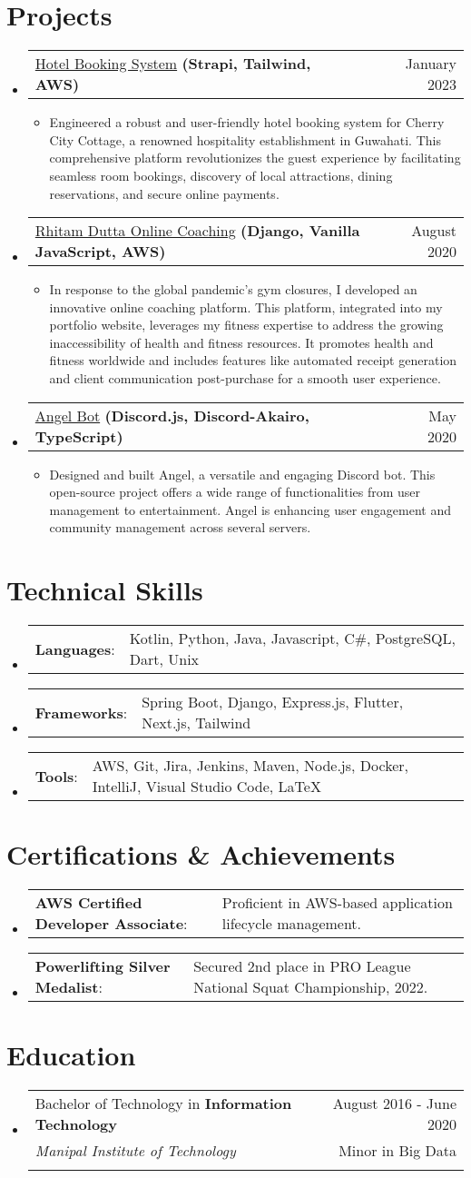 \documentclass[letterpaper,11pt]{article}
\makeatletter
\newcommand{\sectionStart}{
  \begin{itemize}[label={},leftmargin=0in]
}
\newcommand{\sectionEnd}{
  \end{itemize}
}
\newcommand{\educationItem}[5]{
  \vspace{-1pt}
  \item
  \begin{tabular*}{\textwidth}{l@{\extracolsep{\fill}}r@{}}
    \footnotesize{#1 in \textbf{#2}}  & \footnotesize{#3}\\
    \footnotesize{\textit{#4}} & \footnotesize{#5}\\\vspace{-5pt}
  \end{tabular*}
  \vspace{-5pt}
}
\newcommand{\skillItem}[2]{
  \vspace{-1pt}
  \item
  \begin{tabular*}{1.0\textwidth}{l@{}l@{}}
    \footnotesize{\textbf{#1}: } & \footnotesize{#2}
  \end{tabular*}\vspace{-22pt}
}
\newcommand{\projectHeading}[4]{
  \vspace{-1pt}
  \item
  \begin{tabular*}{1.0\textwidth}{l@{\extracolsep{\fill}}r@{}}
    \small{{\href{#1}{#2}} \textbf{#3}} & \small{#4} \\
  \end{tabular*}\vspace{-5pt}
}
\newcommand{\listStart}{\begin{itemize}}
\newcommand{\listEnd}{\end{itemize}\vspace{-6pt}}
\newcommand{\bulletItem}[1]{
  \item
  \small{
    {#1 \vspace{-1.8pt}}
  }
}
\newcommand{\certItem}[2]{
  \vspace{-1pt}
  \item
  \begin{tabular*}{1.0\textwidth}{l@{}l@{}}
    \footnotesize{\textbf{#1}: } & \footnotesize{#2}
  \end{tabular*}\vspace{-22pt}
}
\makeatother
\begin{document}
\section{Projects}
\sectionStart
\projectHeading
    {https://github.com/exthazor/CherryCityCottage-Frontend/}
    {Hotel Booking System}
    {(Strapi, Tailwind, AWS)}
    {January 2023}
  \listStart
    \bulletItem
      {Engineered a robust and user-friendly hotel booking system for Cherry City Cottage, a renowned hospitality establishment in Guwahati. This comprehensive platform revolutionizes the guest experience by facilitating seamless room bookings, discovery of local attractions, dining reservations, and secure online payments.}
  \listEnd
  \projectHeading
    {https://github.com/exthazor/rhitamdutta/}
    {Rhitam Dutta Online Coaching}
    {(Django, Vanilla JavaScript, AWS)}
    {August 2020}
  \listStart
    \bulletItem
      {In response to the global pandemic's gym closures, I developed an innovative online coaching platform. This platform, integrated into my portfolio website, leverages my fitness expertise to address the growing inaccessibility of health and fitness resources. It promotes health and fitness worldwide and includes features like automated receipt generation and client communication post-purchase for a smooth user experience.}
  \listEnd
  \projectHeading
    {https://github.com/exthazor/angel}
    {Angel Bot}
    {(Discord.js, Discord-Akairo, TypeScript)}
    {May 2020}
  \listStart
    \bulletItem
    {Designed and built Angel, a versatile and engaging Discord bot. This open-source project offers a wide range of functionalities from user management to entertainment. Angel is enhancing user engagement and community management across several servers.}
  \listEnd
\sectionEnd

\section{Technical Skills}
\sectionStart
  \skillItem
    {Languages}
    {Kotlin, Python, Java, Javascript, C\#, PostgreSQL, Dart, Unix}
  \skillItem
    {Frameworks}
    {Spring Boot, Django, Express.js, Flutter, Next.js, Tailwind}
  \skillItem
    {Tools}
    {AWS, Git, Jira, Jenkins, Maven, Node.js, Docker, IntelliJ, Visual Studio Code, \LaTeX\ }
  \vspace{3pt}
\sectionEnd

\section{Certifications \& Achievements}
\sectionStart
    \certItem 
     {AWS Certified Developer Associate} {Proficient in AWS-based application lifecycle management.}
    \certItem 
     {Powerlifting Silver Medalist} {Secured 2nd place in PRO League National Squat Championship, 2022.}
\sectionEnd


\section{Education}
\sectionStart
  \educationItem
    {Bachelor of Technology} 
    {Information Technology} 
    {August 2016 - June 2020}
    {Manipal Institute of Technology} 
    {Minor in Big Data}
\sectionEnd
\end{document}
